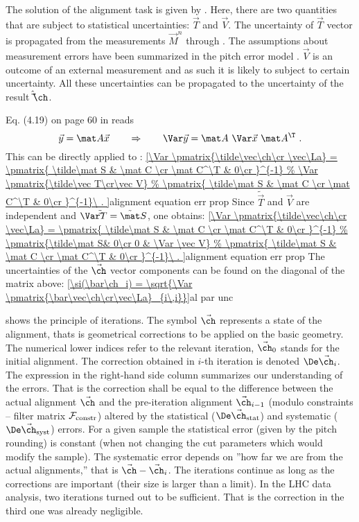 
The solution of the alignment task is given by . Here, there are two quantities that are subject to statistical uncertainties: $\vec T$ and $\vec V$. The uncertainty of $\vec T$ vector is propagated from the measurements $\vec M^n$ through . The assumptions about measurement errors have been summarized in the pitch error model . $\vec V$ is an outcome of an external measurement and as such it is likely to subject to certain uncertainty. All these uncertainties can be propagated to the uncertainty of the result $\hat\vec\ch$.

Eq\hbox{.} (4.19) on page 60 in  reads
$$\vec y = \mat A\vec x \qquad \Rightarrow \qquad \Var\vec y = \mat A\ \Var\vec x\ \mat A^\T\ .$$
This can be directly applied to :
\eqref{\Var \pmatrix{\tilde\vec\ch\cr \vec\La} = 
\pmatrix{
\tilde\mat S & \mat C \cr
\mat C^\T & 0\cr
}^{-1}
%
\Var \pmatrix{\tilde\vec T\cr\vec V}
%
\pmatrix{
\tilde\mat S & \mat C \cr
\mat C^\T & 0\cr
}^{-1}\ .
}{alignment equation err prop}
Since $\tilde\vec T$ and $\vec V$ are independent and $\Var \tilde\vec T = \tilde\mat S$, one obtains:
\eqref{\Var \pmatrix{\tilde\vec\ch\cr \vec\La} = 
\pmatrix{
\tilde\mat S & \mat C \cr
\mat C^\T & 0\cr
}^{-1}
%
\pmatrix{\tilde\mat S& 0\cr 0 & \Var \vec V}
%
\pmatrix{
\tilde\mat S & \mat C \cr
\mat C^\T & 0\cr
}^{-1}\ .
}{alignment equation err prop}
The uncertainties of the $\vec\ch$ vector components can be found on the diagonal of the matrix above:
\eqref{\si(\bar\ch_i) = \sqrt{\Var \pmatrix{\bar\vec\ch\cr\vec\La}_{i\,i}}}{al par unc}


 shows the principle of iterations. The symbol $\vec\ch$ represents a state of the alignment, thats is geometrical corrections to be applied on the basic geometry. The numerical lower indices refer to the relevant iteration, $\vec\ch_0$ stands for the initial alignment. The correction obtained in $i$-th iteration is denoted $\De \vec\ch_i$. The expression in the right-hand side column summarizes our understanding of the errors. That is the correction shall be equal to the difference between the actual alignment $\vec\ch$ and the pre-iteration alignment $\vec\ch_{i-1}$ (modulo constraints -- filter matrix ${\cal F}_{\rm constr}$) altered by the statistical ($\De \vec\ch_{\rm stat}$) and systematic ($\De \vec\ch_{\rm syst}$) errors. For a given sample the statistical error (given by the pitch rounding) is constant (when not changing the cut parameters which would modify the sample). The systematic error depends on ''how far we are from the actual alignments,'' that is $\vec\ch - \vec\ch_i$. The iterations continue as long as the corrections are important (their size is larger than a limit). In the LHC data analysis, two iterations turned out to be sufficient. That is the correction in the third one was already negligible.

